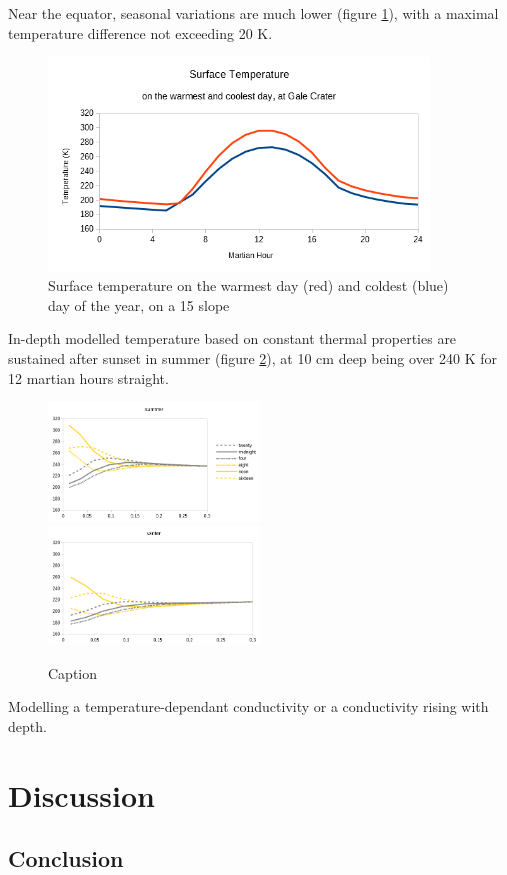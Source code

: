 \documentclass{report}
\begin{document}
Near the equator, seasonal variations are much lower (figure \ref{hourlygale}), with a maximal temperature difference not exceeding 20 K. \\
\begin{figure}
    \centering
    \includegraphics[width=0.9\textwidth]{graphs/0108-gale-hourly.png}
    \caption{Surface temperature on the warmest day (red) and coldest (blue) day of the year, on a 15 \degree slope}
    \label{hourlygale}
\end{figure}{}

In-depth modelled temperature based on constant thermal properties are sustained after sunset in summer (figure \ref{profilenewton}), at 10 cm deep being over 240 K for 12 martian hours straight.  
\begin{figure}
    \centering
    \includegraphics[width=0.5\textwidth]{graphs/0208-newton-profile-summer.png}
    \includegraphics[width=0.5\textwidth]{graphs/0208-newton-profile-winter.png}
    \caption{Caption}
    \label{profilenewton}
\end{figure}{}

Modelling a temperature-dependant conductivity or a conductivity rising with depth. \\

\chapter{Discussion}

\section*{Conclusion}

\printbibliography 
\end{document}
